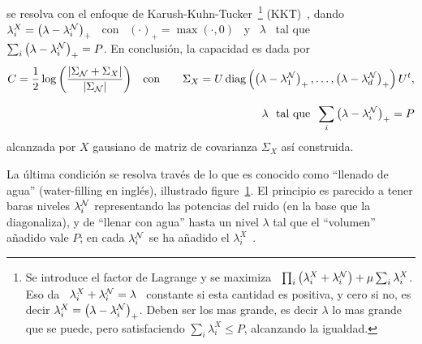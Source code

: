 se resolva con el enfoque de Karush-Kuhn-Tucker~\footnote{Se introduce el factor
  de Lagrange  y se  maximiza \ $\prod_i  \left( \lambda^X_i  + \lambda^{\mathcal{N}}_i
  \right) + \mu \sum_i \lambda^X_i$.  Eso da \ $\lambda^X_i + \lambda^{\mathcal{N}}_i =
  \lambda$ \  constante si  esta cantidad es  positiva, y  cero si no,  es decir
  $\lambda^X_i = \left( \lambda - \lambda^{\mathcal{N}}_i \right)_+$. Deben ser los mas
  grande,  es decir $\lambda$  lo mas  grande que  se puede,  pero satisfaciendo
  $\sum_i \lambda^X_i  \le P$, \ie alcanzando  la igualdad.}  (KKT)~\cite{Mil00,
  CamMar09}, dando \ $\lambda^X_i = \left( \lambda - \lambda^{\mathcal{N}}_i \right)_+$
\ con \ $(\cdot)_+  = \max(\cdot,0)$ \ y \ $\lambda$ \  tal que \ $\sum_i \left(
  \lambda - \lambda^{\mathcal{N}}_i  \right)_+ = P$.  En conclusi\'on,  la capacidad es
dada por
%
\begin{eqnarray*}
C =  \frac12 \log \left(  \frac{\left| \Sigma_\Gauss +  \Sigma_X \right|}{\left|
      \Sigma_\Gauss  \right|}  \right)  & \quad \mbox{con} \quad &  \Sigma_X  =  U
\diag\left( \left(\lambda - \lambda^\Gauss_1\right)_+ , \ldots , \left(\lambda -
    \lambda^\Gauss_d \right)_+ \right) U^t,\\[2.5mm]
%
& &  \lambda \ \mbox{ tal que } \:
\sum_i \left(\lambda - \lambda^\Gauss_i \right)_+ = P
\end{eqnarray*}
%
alcanzada por $X$ gausiano de matriz de covarianza $\Sigma_X$ así construida.

La \'ultima condici\'on se resolva trav\'es de lo que es conocido como ``llenado
de       agua''        (water-filling       en       ingl\'es),       illustrado
figure~\ref{fig:SZ:WaterFilling}. El principio es parecido a tener baras niveles
$\lambda^{\mathcal{N}}_i$  representando las  potencias del  ruido (en  la base  que la
diagonaliza),  y de  ``llenar con  agua'' hasta  un nivel  $\lambda$ tal  que el
``volumen'' a\~nadido  vale $P$; en  cada $\lambda^{\mathcal{N}}_i$ se ha  a\~nadido el
$\lambda^X_i$~\cite[Sec.~9.4]{CovTho06}.

\begin{figure}[h!]
  \begin{center}    \end{center} 
\label{fig:SZ:WaterFilling}
\end{figure}

